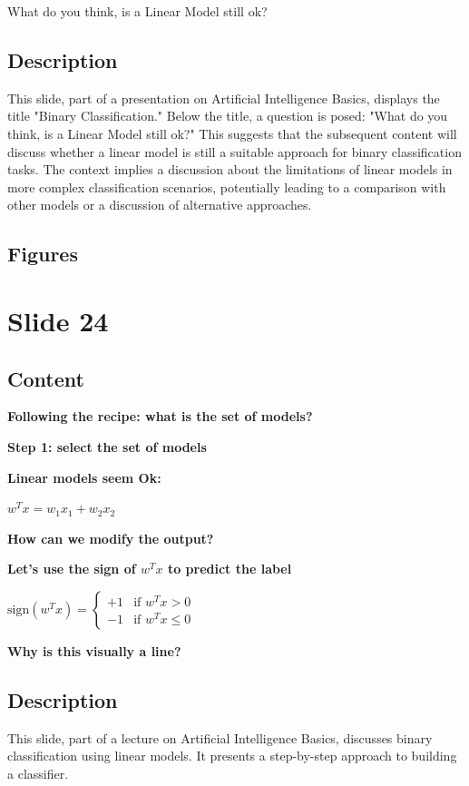 \documentclass{article}%
\begin{document}
What do you think, is a Linear Model still ok?
%
\subsection{Description}%
This slide, part of a presentation on Artificial Intelligence Basics, displays the title "Binary Classification."  Below the title, a question is posed: "What do you think, is a Linear Model still ok?" This suggests that the subsequent content will discuss whether a linear model is still a suitable approach for binary classification tasks.  The context implies a discussion about the limitations of linear models in more complex classification scenarios, potentially leading to a comparison with other models or a discussion of alternative approaches.%
\subsection{Figures}%
\begin{figure}[H]%
\centering%
\end{figure}

%
\newpage%
\section{Slide 24}%
\label{sec:Slide24}%
\subsection{Content}%

\textbf{Following the recipe: what is the set of models?}

\textbf{Step 1: select the set of models}

\textbf{Linear models seem Ok:}

$w^Tx = w_1x_1 + w_2x_2$

\textbf{How can we modify the output?}

\textbf{Let's use the sign of $w^Tx$ to predict the label}

$\text{sign}(w^Tx) = \begin{cases}
+1 & \text{if } w^Tx > 0 \\
-1 & \text{if } w^Tx \le 0
\end{cases}$

\textbf{Why is this visually a line?}
%
\subsection{Description}%
This slide, part of a lecture on Artificial Intelligence Basics, discusses binary classification using linear models.  It presents a step-by-step approach to building a classifier.
\end{document}
